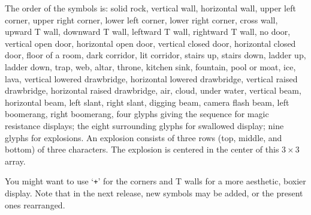 The order of the symbols is: solid rock, vertical wall, horizontal
wall, upper left corner, upper right corner, lower left corner, lower
right corner, cross wall, upward T wall, downward T wall, leftward T
wall, rightward T wall, no door, vertical open door, horizontal open
door, vertical closed door, horizontal closed door, floor of a room,
dark corridor, lit corridor, stairs up, stairs down, ladder up, ladder
down, trap, web, altar, throne, kitchen sink, fountain, pool or moat,
ice, lava, vertical lowered drawbridge, horizontal lowered drawbridge,
vertical raised drawbridge, horizontal raised drawbridge, air, cloud,
under water, vertical beam, horizontal beam, left slant, right slant,
digging beam, camera flash beam, left boomerang, right boomerang, four
glyphs giving the sequence for magic resistance displays; the eight
surrounding glyphs for swallowed display; nine glyphs for explosions.
An explosion consists of three rows (top, middle, and bottom) of three
characters.  The explosion is centered in the center of this $3 \times 3$
array.

You might want to use `{\tt +}' for the corners and T walls for a more
aesthetic, boxier display.  Note that in the next release, new symbols
may be added, or the present ones rearranged.

